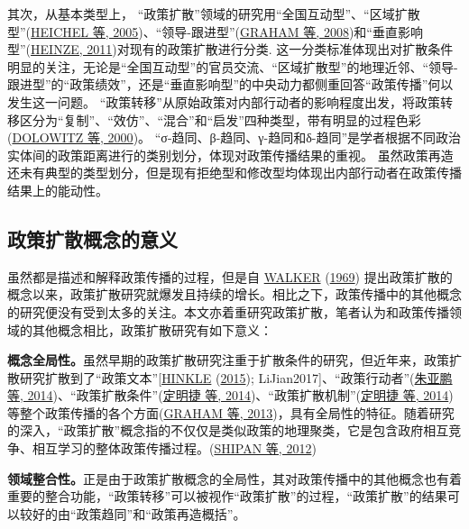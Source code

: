 \documentclass[
  12pt,
]{ctexart}
\begin{document}
其次，从基本类型上，
``政策扩散''领域的研究用``全国互动型''、``区域扩散型''(\protect\hyperlink{ref-HeichelEtAl2005}{HEICHEL 等, 2005})、``领导-跟进型''(\protect\hyperlink{ref-GrahamEtAl2008}{GRAHAM 等, 2008})和``垂直影响型''(\protect\hyperlink{ref-Heinze2011}{HEINZE, 2011})对现有的政策扩散进行分类.
这一分类标准体现出对扩散条件明显的关注，无论是``全国互动型''的官员交流、``区域扩散型''的地理近邻、``领导-跟进型''的``政策绩效''，还是``垂直影响型''的中央动力都侧重回答``政策传播''何以发生这一问题。
``政策转移''从原始政策对内部行动者的影响程度出发，将政策转移区分为``复制''、``效仿''、``混合''和``启发''四种类型，带有明显的过程色彩(\protect\hyperlink{ref-DolowitzMarsh2000}{DOLOWITZ 等, 2000})。
``σ-趋同、β-趋同、γ-趋同和δ-趋同''是学者根据不同政治实体间的政策距离进行的类别划分，体现对政策传播结果的重视。
虽然政策再造还未有典型的类型划分，但是现有拒绝型和修改型均体现出内部行动者在政策传播结果上的能动性。

\hypertarget{ux653fux7b56ux6269ux6563ux6982ux5ff5ux7684ux610fux4e49}{%
\subsection{政策扩散概念的意义}\label{ux653fux7b56ux6269ux6563ux6982ux5ff5ux7684ux610fux4e49}}

虽然都是描述和解释政策传播的过程，但是自 \protect\hyperlink{ref-Walker1969}{WALKER} (\protect\hyperlink{ref-Walker1969}{1969}) 提出政策扩散的概念以来，政策扩散研究就爆发且持续的增长。相比之下，政策传播中的其他概念的研究便没有受到太多的关注。本文亦着重研究政策扩散，笔者认为和政策传播领域的其他概念相比，政策扩散研究有如下意义：

\textbf{概念全局性。}虽然早期的政策扩散研究注重于扩散条件的研究，但近年来，政策扩散研究扩散到了``政策文本''{[}\protect\hyperlink{ref-Hinkle2015}{HINKLE} (\protect\hyperlink{ref-Hinkle2015}{2015}); LiJian2017{]}、``政策行动者''(\protect\hyperlink{ref-ZhuYaPengXiaoDiWen2014}{朱亚鹏 等, 2014})、``政策扩散条件''(\protect\hyperlink{ref-DingMingJieZhangLiang2014}{定明捷 等, 2014})、``政策扩散机制''(\protect\hyperlink{ref-DingMingJieZhangLiang2014}{定明捷 等, 2014})等整个政策传播的各个方面(\protect\hyperlink{ref-GrahamEtAl2013}{GRAHAM 等, 2013})，具有全局性的特征。随着研究的深入，``政策扩散''概念指的不仅仅是类似政策的地理聚类，它是包含政府相互竞争、相互学习的整体政策传播过程。(\protect\hyperlink{ref-ShipanVolden2012}{SHIPAN 等, 2012})

\textbf{领域整合性。}正是由于政策扩散概念的全局性，其对政策传播中的其他概念也有着重要的整合功能，``政策转移''可以被视作``政策扩散''的过程，``政策扩散''的结果可以较好的由``政策趋同''和``政策再造概括''。
\end{document}
